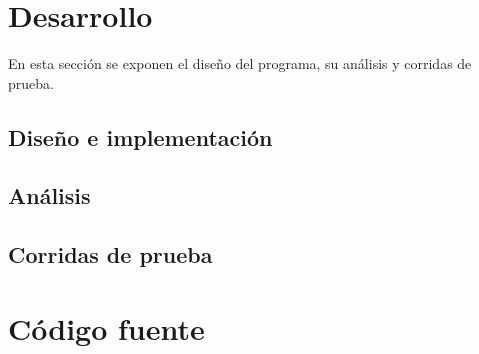 \documentclass[10pt,a4paper]{article}
\begin{document}
		

	\section{Desarrollo}
		En esta sección se exponen el diseño del programa, su análisis y corridas de prueba.

		\subsection{Diseño e implementación}	\label{sec:diseño}
			

		\subsection{Análisis} 			\label{sec:analisis}
			

		\subsection{Corridas de prueba}
			
	\section{Código fuente}
		
\end{document}
